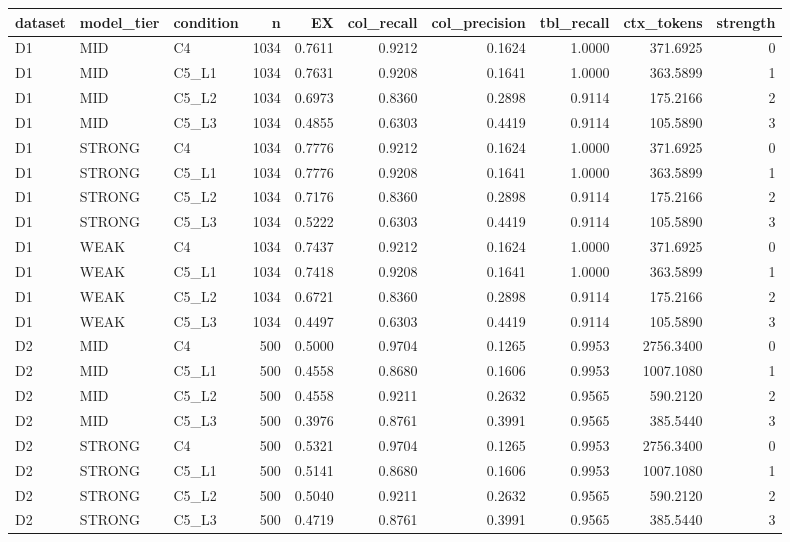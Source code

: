 \begin{tabular}{lllrrrrrrr}
\toprule
dataset & model\_tier & condition & n & EX & col\_recall & col\_precision & tbl\_recall & ctx\_tokens & strength \\
\midrule
D1 & MID & C4 & 1034 & 0.7611 & 0.9212 & 0.1624 & 1.0000 & 371.6925 & 0 \\
D1 & MID & C5\_L1 & 1034 & 0.7631 & 0.9208 & 0.1641 & 1.0000 & 363.5899 & 1 \\
D1 & MID & C5\_L2 & 1034 & 0.6973 & 0.8360 & 0.2898 & 0.9114 & 175.2166 & 2 \\
D1 & MID & C5\_L3 & 1034 & 0.4855 & 0.6303 & 0.4419 & 0.9114 & 105.5890 & 3 \\
D1 & STRONG & C4 & 1034 & 0.7776 & 0.9212 & 0.1624 & 1.0000 & 371.6925 & 0 \\
D1 & STRONG & C5\_L1 & 1034 & 0.7776 & 0.9208 & 0.1641 & 1.0000 & 363.5899 & 1 \\
D1 & STRONG & C5\_L2 & 1034 & 0.7176 & 0.8360 & 0.2898 & 0.9114 & 175.2166 & 2 \\
D1 & STRONG & C5\_L3 & 1034 & 0.5222 & 0.6303 & 0.4419 & 0.9114 & 105.5890 & 3 \\
D1 & WEAK & C4 & 1034 & 0.7437 & 0.9212 & 0.1624 & 1.0000 & 371.6925 & 0 \\
D1 & WEAK & C5\_L1 & 1034 & 0.7418 & 0.9208 & 0.1641 & 1.0000 & 363.5899 & 1 \\
D1 & WEAK & C5\_L2 & 1034 & 0.6721 & 0.8360 & 0.2898 & 0.9114 & 175.2166 & 2 \\
D1 & WEAK & C5\_L3 & 1034 & 0.4497 & 0.6303 & 0.4419 & 0.9114 & 105.5890 & 3 \\
D2 & MID & C4 & 500 & 0.5000 & 0.9704 & 0.1265 & 0.9953 & 2756.3400 & 0 \\
D2 & MID & C5\_L1 & 500 & 0.4558 & 0.8680 & 0.1606 & 0.9953 & 1007.1080 & 1 \\
D2 & MID & C5\_L2 & 500 & 0.4558 & 0.9211 & 0.2632 & 0.9565 & 590.2120 & 2 \\
D2 & MID & C5\_L3 & 500 & 0.3976 & 0.8761 & 0.3991 & 0.9565 & 385.5440 & 3 \\
D2 & STRONG & C4 & 500 & 0.5321 & 0.9704 & 0.1265 & 0.9953 & 2756.3400 & 0 \\
D2 & STRONG & C5\_L1 & 500 & 0.5141 & 0.8680 & 0.1606 & 0.9953 & 1007.1080 & 1 \\
D2 & STRONG & C5\_L2 & 500 & 0.5040 & 0.9211 & 0.2632 & 0.9565 & 590.2120 & 2 \\
D2 & STRONG & C5\_L3 & 500 & 0.4719 & 0.8761 & 0.3991 & 0.9565 & 385.5440 & 3 \\

\end{tabular}
